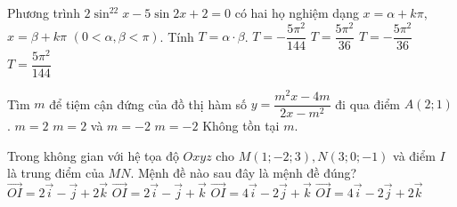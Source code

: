 \begin{ex}%
Phương trình $2\sin^22x - 5\sin2x+2=0$ có hai họ nghiệm dạng $x = \alpha + k\pi$, $x = \beta + k\pi$ $(0 < \alpha,\beta < \pi)$. Tính $T = \alpha \cdot \beta$.
\choice
{$T = -\dfrac{5\pi^2}{144}$}
{\True $T = \dfrac{5\pi^2}{36}$}
{$T = -\dfrac{5\pi^2}{36}$}
{$T = \dfrac{5\pi^2}{144}$}
\end{ex}


\begin{ex}%
Tìm  $m$ để  tiệm cận đứng của đồ thị  hàm số  $y = \dfrac{m^2x-4m}{2x-m^2}$ đi qua điểm $A(2;1)$. 
\choice
{$m = 2$}
{$m = 2$ và $m=-2$}
{\True $m = -2$}
{Không tồn tại $m$.}
\end{ex}

\begin{ex}%
Trong không gian với hệ  tọa độ  $Oxyz$  cho  $M(1; -2; 3), N(3; 0; -1)$  và điểm $I$   là trung điểm của  $MN$. Mệnh đề nào 
sau đây là mệnh đề  đúng?  
\choice
{$\overrightarrow{OI} = 2\overrightarrow{i}-\overrightarrow{j}+2\overrightarrow{k}$}
{\True  $\overrightarrow{OI} = 2\overrightarrow{i}-\overrightarrow{j}+\overrightarrow{k}$}
{$\overrightarrow{OI} = 4\overrightarrow{i}-2\overrightarrow{j}+\overrightarrow{k}$}
{$\overrightarrow{OI} = 4\overrightarrow{i}-2\overrightarrow{j}+2\overrightarrow{k}$}
\end{ex}

